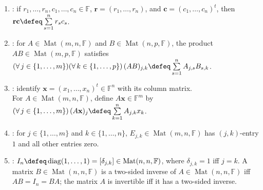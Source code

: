 \begin{definition}
\begin{enumerate}[label=(\roman*)]
\item {}: if $r_1,\ldots,r_n,c_1,\ldots,c_n\in\mathbb{F}$, $\mathbf{r}=(r_1,\ldots,r_n)$, and $\mathbf{c}=(c_1,\ldots,c_n)^t$, then $\mathbf{r}\mathbf{c}\defeq\sum\limits_{s=1}^{n}r_sc_s$.
\item {}: for $A\in\operatorname{Mat}(m,n,\mathbb{F})$ and $B\in\operatorname{Mat}(n,p,\mathbb{F})$, the product $AB\in\operatorname{Mat}(m,p,\mathbb{F})$ satisfies\\
$(\forall\,j\in\{1,\ldots,m\})(\forall\,k\in\{1,\ldots,p\})\,(AB)_{j,k}\defeq\sum\limits_{s=1}^{n}A_{j,s}B_{s,k}$.
\item {}: identify $\mathbf{x}=(x_1,\ldots,x_n)^t\in\mathbb{F}^n$ with its column matrix.\\
For $A\in\operatorname{Mat}(m,n,\mathbb{F})$, define $A\mathbf{x}\in\mathbb{F}^m$ by $(\forall\,j\in\{1,\ldots,m\})\,(A\mathbf{x})_j\defeq\sum\limits_{k=1}^{n}A_{j,k}x_k$.
\item {}: for $j\in\{1,\ldots,m\}$ and $k\in\{1,\ldots,n\}$, $E_{j,k}\in\operatorname{Mat}(m,n,\mathbb{F})$ has $(j,k)$-entry $1$ and all other entries zero.
\item {}: $I_n\defeq\operatorname{diag}(1,\ldots,1)=[\delta_{j,k}]\in\operatorname{Mat}(n,n,\mathbb{F})$, where $\delta_{j,k}=1$ iff $j=k$. A matrix $B\in\operatorname{Mat}(n,n,\mathbb{F})$ is a two-sided inverse of $A\in\operatorname{Mat}(n,n,\mathbb{F})$ iff $AB=I_n=BA$; the matrix $A$ is invertible iff it has a two-sided inverse.
\end{enumerate}
\end{definition}

